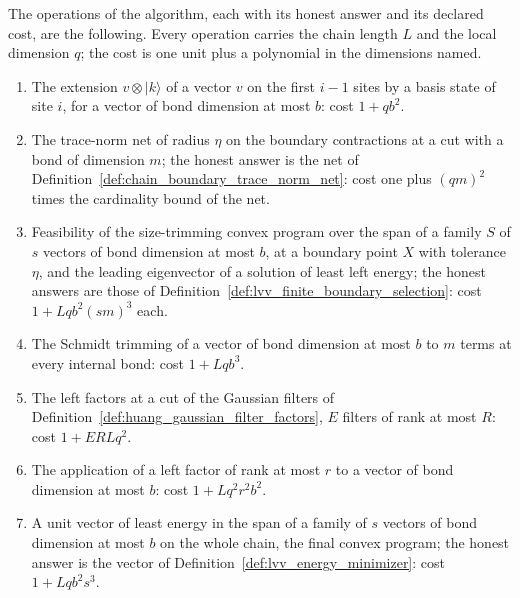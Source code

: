 \begin{definition}
    \label{def:lvv_linear_algebra_query}
    \leanok
    The operations of the algorithm, each with its honest answer and its
    declared cost, are the following. Every operation carries the chain length
    $L$ and the local dimension $q$; the cost is one unit plus a polynomial in
    the dimensions named.
    \begin{enumerate}
        \item The extension $v\otimes|k\rangle$ of a vector $v$ on the first
              $i-1$ sites by a basis state of site $i$, for a vector of bond
              dimension at most $b$: cost $1+qb^2$.
        \item The trace-norm net of radius $\eta$ on the boundary contractions at
              a cut with a bond of dimension $m$; the honest answer is the net
              of Definition~\ref{def:chain_boundary_trace_norm_net}: cost one
              plus $(qm)^2$ times the cardinality bound of the net.
        \item Feasibility of the size-trimming convex program over the span of a
              family $S$ of $s$ vectors of bond dimension at most $b$, at a
              boundary point $X$ with tolerance $\eta$, and the leading
              eigenvector of a solution of least left energy; the honest answers
              are those of Definition~\ref{def:lvv_finite_boundary_selection}:
              cost $1+Lqb^2(sm)^3$ each.
        \item The Schmidt trimming of a vector of bond dimension at most $b$ to
              $m$ terms at every internal bond: cost $1+Lqb^3$.
        \item The left factors at a cut of the Gaussian filters of
              Definition~\ref{def:huang_gaussian_filter_factors}, $E$ filters
              of rank at most $R$: cost $1+ERLq^2$.
        \item The application of a left factor of rank at most $r$ to a vector
              of bond dimension at most $b$: cost $1+Lq^2r^2b^2$.
        \item A unit vector of least energy in the span of a family of $s$
              vectors of bond dimension at most $b$ on the whole chain, the
              final convex program; the honest answer is the vector of
              Definition~\ref{def:lvv_energy_minimizer}: cost $1+Lqb^2s^3$.
    \end{enumerate}
\end{definition}

